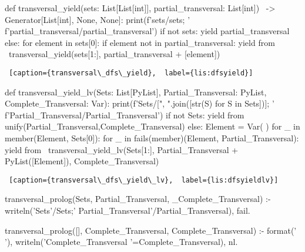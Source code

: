 \begin{center}
\begin{minipage}{\linewidth}
\begin{python}[numbers=left]
def transversal_yield(sets: List[List[int]], 
                      partial_transversal: List[int]) \
                      -> Generator[List[int], None, None]:
  print(f'sets/{sets}; '
        f'partial_transversal/{partial_transversal}')
  if not sets:
    yield partial_transversal
  else:
    for element in sets[0]:
      if element not in partial_transversal:
        yield from \ 
          transversal_yield(sets[1:], partial_transversal + [element])
            
\end{python}
\begin{lstlisting} [caption={transversal\_dfs\_yield},  label={lis:dfsyield}]
\end{lstlisting}
\end{minipage}


\begin{minipage}{\linewidth}
\begin{python}[numbers=left]
def transversal_yield_lv(Sets: List[PyList], 
                         Partial_Transversal: PyList,
                         Complete_Transversal: Var):
  print(f'Sets/[{", ".join([str(S) for S in Sets])}]; '
        f'Partial_Transversal/{Partial_Transversal}')
  if not Sets:
    yield from unify(Partial_Transversal,Complete_Transversal)
  else:
    Element = Var( )
    for _ in member(Element, Sets[0]):
      for _ in fails(member)(Element, Partial_Transversal):
        yield from \
          transversal_yield_lv(Sets[1:], 
                               Partial_Transversal + PyList([Element]), 
                               Complete_Transversal)
    \end{python}
    \begin{lstlisting} [caption={transversal\_dfs\_yield\_lv},  label={lis:dfsyieldlv}]
    \end{lstlisting}
\end{minipage}


\begin{minipage}{\linewidth}
\begin{python}[numbers=left]
transversal_prolog(Sets, Partial_Transversal, _Complete_Transversal) :-
    writeln('Sets'/Sets;'  Partial_Transversal'/Partial_Transversal), 
    fail.

transversal_prolog([], Complete_Transversal, Complete_Transversal) :-
    format('                                  '),
    writeln('Complete_Transversal '=Complete_Transversal), nl.


\end{python}
\end{minipage}
\end{center}
